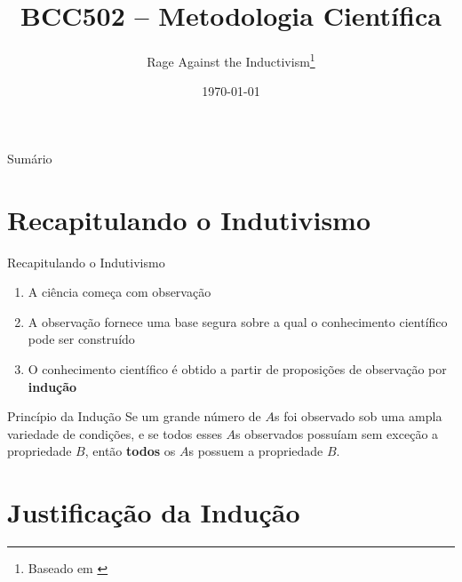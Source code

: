 \documentclass[aspectratio=169]{beamer}
\title{BCC502 -- Metodologia Científica}
\author{Rage Against the Inductivism\footnote{Baseado em \citep{chalmers1993ciencia}}}
\date{\today}
\newcommand{\impt}[1]{\textcolor{maccent}{\textbf{#1}}}
\begin{document}
\begin{frame}[plain]\titlepage\end{frame}

\begin{frame}{Sumário}\tableofcontents\end{frame}

\section{Recapitulando o Indutivismo}

\begin{frame}{Recapitulando o Indutivismo}
  \begin{enumerate}
    \item A ciência começa com observação
    \pause
    \item A observação fornece uma base segura sobre a qual o conhecimento científico pode ser construído
    \pause
    \item O conhecimento científico é obtido a partir de proposições de observação por \impt{indução}
  \end{enumerate}

  \vspace{0.4cm}
  \begin{block}{Princípio da Indução}
    Se um grande número de \(A\)s foi observado sob uma ampla variedade de condições, e se todos esses \(A\)s observados possuíam sem exceção a propriedade \(B\), então \impt{todos} os \(A\)s possuem a propriedade \(B\).
  \end{block}
\end{frame}

\section{Justificação da Indução}
\end{document}
